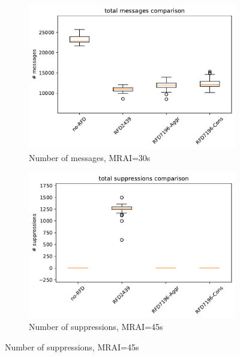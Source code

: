 \begin{figure}[H]
     \hfill
     \begin{subfigure}[b]{0.325\textwidth}
         \centering
         \includegraphics[width=\textwidth]{images/RFD/miceVSelephants/MultiMRAI/45/elephants/cisco_1000MRAI45_rfd_comparison_messages_boxplot.pdf}
         \caption{\scriptsize Number of messages, MRAI=30s}
         \label{fig:1000_RFD_MRAI45_messages_elephant}
     \end{subfigure}
     \hfill
     \begin{subfigure}[b]{0.325\textwidth}
         \centering
         \includegraphics[width=\textwidth]{images/RFD/miceVSelephants/MultiMRAI/45/elephants/cisco_1000MRAI45_rfd_comparison_suppressions_boxplot.pdf}
         \caption{\scriptsize Number of suppressions, MRAI=45s}
         \label{fig:1000_RFD_MRAI45_suppressions_elephant}
     \end{subfigure}

\end{figure}
